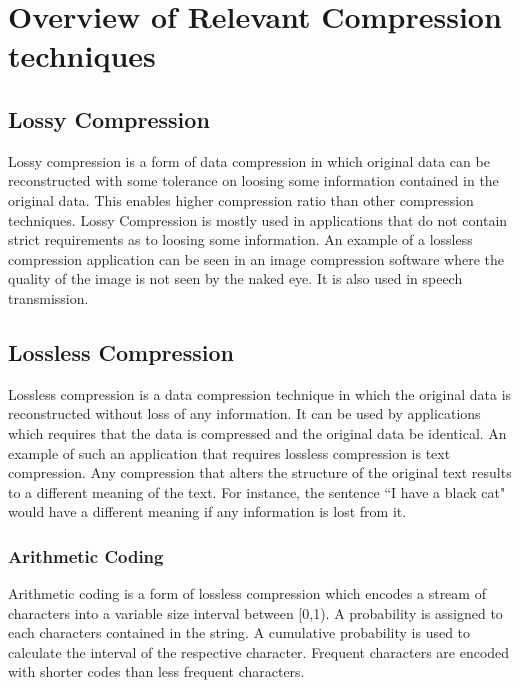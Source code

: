 \section{Overview of Relevant Compression techniques}

\subsection{Lossy Compression}

Lossy compression \cite{Sayood:2000:IDC:336428} is a form of data compression in which original data can be reconstructed with some tolerance on loosing some information contained in the original data. This enables higher compression ratio than other compression techniques. Lossy Compression is mostly used in applications that do not contain strict requirements as to loosing some information. An example of a lossless compression application can be seen in an image compression software where the quality of the image is not seen by the naked eye. It is also used in speech transmission. 

\subsection{Lossless Compression}
Lossless compression \cite{Sayood:2000:IDC:336428} is a data compression technique in which the original data is reconstructed without loss of any information. It can be used by applications which requires that the data is compressed and the original data be identical. An example of such an application that requires lossless compression is text compression.  Any compression that alters the structure of the original text results to a different meaning of the text. For instance, the sentence ``I have a black cat" would have a different meaning if any information is lost from it.



\subsubsection{Arithmetic Coding}

Arithmetic coding is a form of lossless compression which encodes a stream of characters into a variable size interval between [0,1). A probability is assigned to each characters contained in the string. A cumulative probability is used to calculate the interval of the respective character. Frequent characters are encoded with shorter codes than less frequent characters. 

